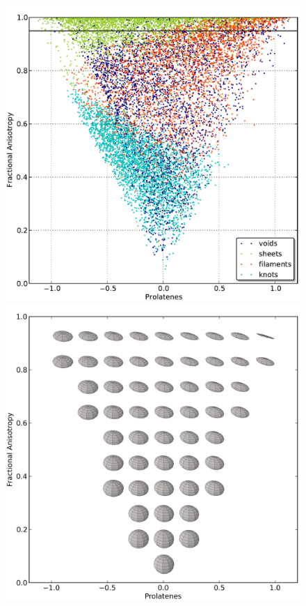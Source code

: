 \documentclass[a4,useAMS,usenatbib,usegraphicx]{latex/mn2e}
\begin{document}
\begin{flushleft}
\begin{figure}
\centering

  \includegraphics[trim = 0mm 1mm 0mm 1mm, clip, keepaspectratio=true,
  width=0.3\textheight]{./figures/FA_Prolatenes_Vweb.pdf}
  \includegraphics[trim = 0mm 1mm 0mm 1mm, clip, keepaspectratio=true,
  width=0.3\textheight]{./figures/FA_Prolatenes.png}  
  

  \label{fig:L1_correlations}
  \vspace{0.1 cm}

\end{figure}
\end{flushleft}
\end{document}
